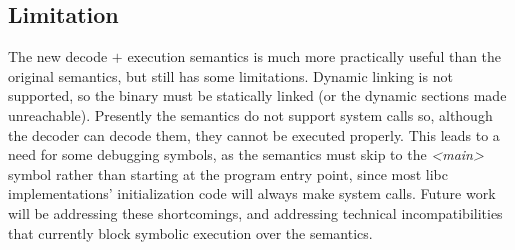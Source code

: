 \subsection{Limitation}
The new decode $+$ execution semantics is much more practically useful than the original semantics, but still has some limitations.  Dynamic linking is not supported, so the binary must be statically linked (or the dynamic sections made unreachable).  Presently the semantics do not support system calls so, although the decoder can decode them, they cannot be executed properly.  This leads to a need for some debugging symbols, as the semantics must skip to the \emph{<main>} symbol rather than starting at the program entry point, since most libc implementations’ initialization code will always make system calls.  Future work will be addressing these shortcomings, and addressing technical incompatibilities that currently block symbolic execution over the semantics.


